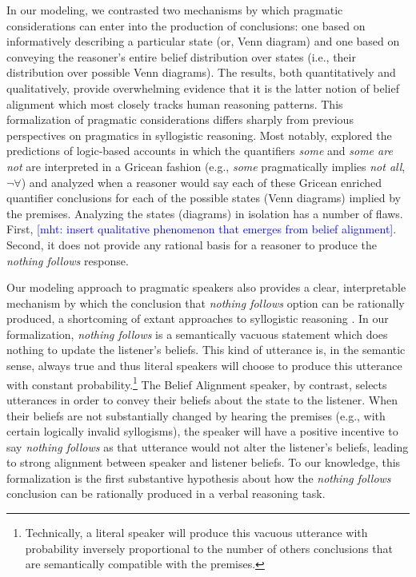 \documentclass[floatsintext, doc]{apa6}
\newcommand{\mht}[1]{{\textcolor{Blue}{[mht: #1]}}}
\begin{document}
In our modeling, we contrasted two mechanisms by which pragmatic considerations can enter into the production of conclusions: one based on informatively describing a particular state (or, Venn diagram) and one based on conveying the reasoner's entire belief distribution over states (i.e., their distribution over possible Venn diagrams). 
The results, both quantitatively and qualitatively, provide overwhelming evidence that it is the latter notion of belief alignment which most closely tracks human reasoning patterns. 
This formalization of pragmatic considerations differs sharply from previous perspectives on pragmatics in syllogistic reasoning.
Most notably,  explored the predictions of logic-based accounts in which the quantifiers \emph{some} and \emph{some are not} are interpreted in a Gricean fashion (e.g., \emph{some} pragmatically implies \emph{not all}, $\neg \forall$) and analyzed when a reasoner would say each of these Gricean enriched quantifier conclusions for each of the possible states (Venn diagrams) implied by the premises. 
Analyzing the states (diagrams) in isolation has a number of flaws.
First, \mht{insert qualitative phenomenon that emerges from belief alignment}.
Second, it does not provide any rational basis for a reasoner to produce the \emph{nothing follows} response.

Our modeling approach to pragmatic speakers also provides a clear, interpretable mechanism by which the conclusion that \emph{nothing follows} option can be rationally produced, a shortcoming of extant approaches to syllogistic reasoning  \cite{riesterer2020modeling}. 
In our formalization, \emph{nothing follows} is a semantically vacuous statement which does nothing to update the listener's beliefs. This kind of utterance is, in the semantic sense, always true and thus literal speakers will choose to produce this utterance with constant probability.\footnote{Technically, a literal speaker will produce this vacuous utterance with probability inversely proportional to the number of others conclusions that are semantically compatible with the premises.}
The Belief Alignment speaker, by contrast, selects utterances in order to convey their beliefs about the state to the listener. 
When their beliefs are not substantially changed by hearing the premises (e.g., with certain logically invalid syllogisms), the speaker will have a positive incentive to say \emph{nothing follows} as that utterance would not alter the listener's beliefs, leading to strong alignment between speaker and listener beliefs. 
To our knowledge, this formalization is the first substantive hypothesis about how the \emph{nothing follows} conclusion can be rationally produced in a verbal reasoning task.
\end{document}
